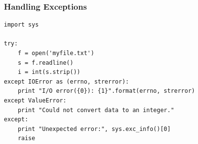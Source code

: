 \documentclass[t,10pt,compress=false,usepdftitle=false]{beamer}
\begin{document}
\begin{frame}[fragile]
    \frametitle{Handling Exceptions}
    \begin{myColorBox}{0.9}{}
\small
\begin{verbatim}
import sys

try:
    f = open('myfile.txt')
    s = f.readline()
    i = int(s.strip())
except IOError as (errno, strerror):
    print "I/O error({0}): {1}".format(errno, strerror)
except ValueError:
    print "Could not convert data to an integer."
except:
    print "Unexpected error:", sys.exc_info()[0]
    raise
\end{verbatim}
    \end{myColorBox}
\end{frame}



\end{document}
